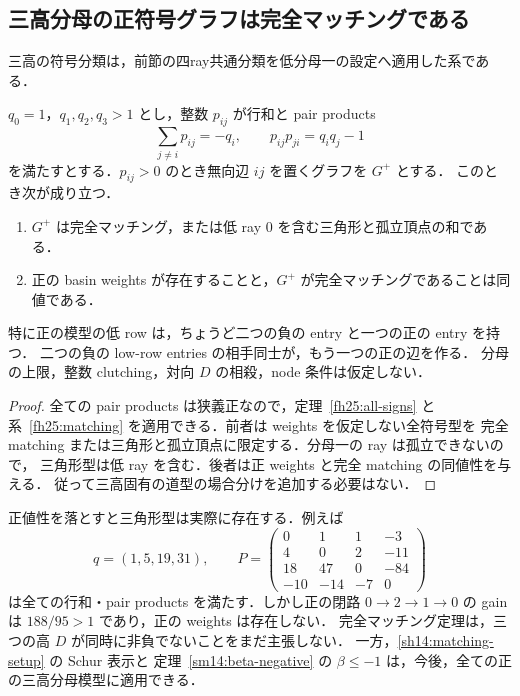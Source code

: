 \subsection{三高分母の正符号グラフは完全マッチングである}
\label{mh18:section}

三高の符号分類は，前節の四ray共通分類を低分母一の設定へ適用した系である．

\begin{theorem}[三高分母の完全マッチング定理]
\label{mh18:matching}
$q_0=1$，$q_1,q_2,q_3>1$ とし，整数 $p_{ij}$ が行和と pair products
\[
 \sum_{j\ne i}p_{ij}=-q_i,\qquad p_{ij}p_{ji}=q_iq_j-1
\]
を満たすとする．$p_{ij}>0$ のとき無向辺 $ij$ を置くグラフを $G^+$ とする．
このとき次が成り立つ．
\begin{enumerate}
\item $G^+$ は完全マッチング，または低 ray $0$ を含む三角形と孤立頂点の和である．
\item 正の basin weights が存在することと，$G^+$ が完全マッチングであることは同値である．
\end{enumerate}
特に正の模型の低 row は，ちょうど二つの負の entry と一つの正の entry を持つ．
二つの負の low-row entries の相手同士が，もう一つの正の辺を作る．
分母の上限，整数 clutching，対向 $D$ の相殺，node 条件は仮定しない．
\end{theorem}

\begin{proof}
全ての pair products は狭義正なので，定理~\ref{fh25:all-signs} と
系~\ref{fh25:matching} を適用できる．前者は weights を仮定しない全符号型を
完全 matching または三角形と孤立頂点に限定する．分母一の ray は孤立できないので，
三角形型は低 ray を含む．後者は正 weights と完全 matching の同値性を与える．
従って三高固有の道型の場合分けを追加する必要はない．
\end{proof}

\begin{remark}[正値性の仮定と適用範囲]
\label{mh18:positivity-essential}
正値性を落とすと三角形型は実際に存在する．例えば
\[
 q=(1,5,19,31),\qquad
 P=\begin{pmatrix}
 0&1&1&-3\\
 4&0&2&-11\\
 18&47&0&-84\\
 -10&-14&-7&0
 \end{pmatrix}
\]
は全ての行和・pair products を満たす．しかし正の閉路 $0\to2\to1\to0$ の gain は
$188/95>1$ であり，正の weights は存在しない．
完全マッチング定理は，三つの高 $D$ が同時に非負でないことをまだ主張しない．
一方，\ref{sh14:matching-setup} の Schur 表示と
定理~\ref{sm14:beta-negative} の $\beta\le-1$ は，今後，全ての正の三高分母模型に適用できる．
\end{remark}
